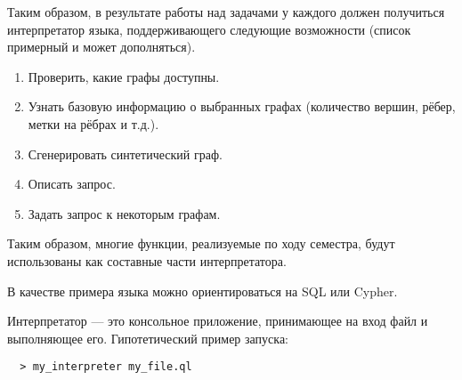 Таким образом, в результате работы над задачами у каждого должен получиться интерпретатор языка, поддерживающего следующие возможности (список примерный и может дополняться).
\begin{enumerate}
\item Проверить, какие графы доступны.
\item Узнать базовую информацию о выбранных графах (количество вершин, рёбер, метки на рёбрах и т.д.).
\item Сгенерировать синтетический граф.
\item Описать запрос.
\item Задать запрос к некоторым графам.
\end{enumerate}
Таким образом, многие функции, реализуемые по ходу семестра, будут использованы как составные части интерпретатора.

В качестве примера языка можно ориентироваться на SQL или Cypher.

Интерпретатор --- это консольное приложение, принимающее на вход файл и выполняющее его.
Гипотетический пример запуска:
\begin{verbatim}
  > my_interpreter my_file.ql
\end{verbatim}


